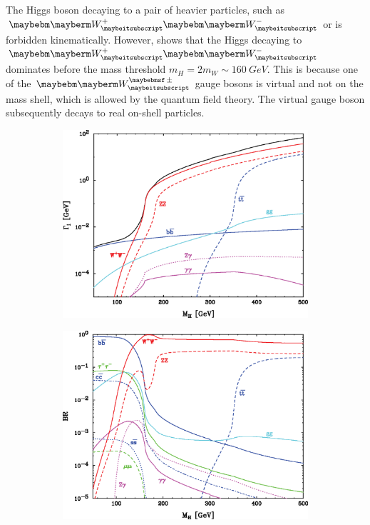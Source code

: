The Higgs boson decaying to a pair of heavier particles, such as $\PWp\PWm$ or \PZ\PZ is forbidden kinematically. However,  shows that the Higgs decaying to  $\PWp\PWm$  dominates before the mass threshold $m_H = 2m_W \sim 160 \ GeV$. This is because one of the $\PWpm$ gauge bosons is virtual and not on the mass shell, which is allowed by the quantum field theory. The virtual gauge boson subsequently decays to real on-shell particles.

\begin{figure}[tbph]
\centering
    \begin{subfigure}[b]{0.45\textwidth}
        \includegraphics[width=\textwidth]{theory/HiggsDecayWidth}
        \caption{}
        \label{fig:theoryHiggsDecayWidth}
    \end{subfigure}
    \begin{subfigure}[b]{0.45\textwidth}
        \includegraphics[width=\textwidth]{theory/HiggsBranchingRatio}

\end{subfigure}
\end{figure}
